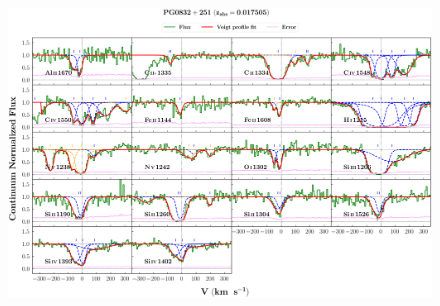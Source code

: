 \documentclass[12pt]{report}
\begin{document}
\begin{landscape}

\begin{figure}
    \centering
    \vspace{-20mm}
    \hspace*{-35mm}
    \includegraphics[width=1.25\linewidth,draft=False]{System-Plots/PG0832+251_z=0.017505_sys_plot.png}
\end{figure}

\end{landscape}
\end{document}
